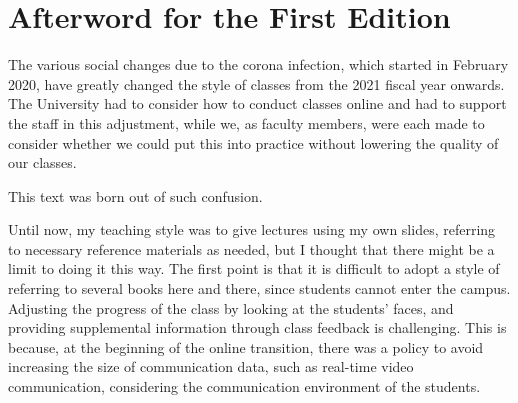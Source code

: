 
\section*{Afterword for the First Edition}

The various social changes due to the corona infection, which started in February 2020, have greatly changed the style of classes from the 2021 fiscal year onwards.
The University had to consider how to conduct classes online and had to support the staff in this adjustment, while we, as faculty members, were each made to consider whether we could put this into practice without lowering the quality of our classes.

This text was born out of such confusion.

Until now, my teaching style was to give lectures using my own slides, referring to necessary reference materials as needed, but I thought that there might be a limit to doing it this way.
The first point is that it is difficult to adopt a style of referring to several books here and there, since students cannot enter the campus.
Adjusting the progress of the class by looking at the students' faces, and providing supplemental information through class feedback is challenging. This is because, at the beginning of the online transition, there was a policy to avoid increasing the size of communication data, such as real-time video communication, considering the communication environment of the students.

